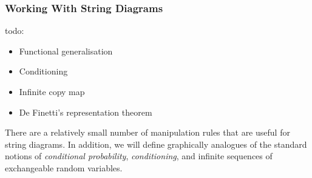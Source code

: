 


\subsubsection{Working With String Diagrams}

todo:
\begin{itemize}
\item Functional generalisation
\item Conditioning
\item Infinite copy map
\item De Finetti's representation theorem
\end{itemize}

There are a relatively small number of manipulation rules that are useful for string diagrams. In addition, we will define graphically analogues of the standard notions of \emph{conditional probability}, \emph{conditioning}, and infinite sequences of exchangeable random variables.

